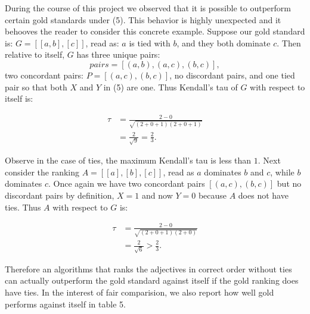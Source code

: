 During the course of this project we observed that it is possible to outperform certain gold standards under (5). This behavior is highly unexpected and it behooves the reader to consider this concrete example. Suppose our gold standard is: $G = [[a,b],[c]]$, read as: $a$ is tied with $b$, and they both dominate $c$. Then relative to itself, $G$ has three unique pairs:
\[
	pairs = [(a,b),(a,c),(b,c)],
\]
two concordant pairs: $P = [(a,c),(b,c)]$, no discordant pairs, and one tied pair so that both $X$ and $Y$ in (5) are one. Thus Kendall's tau of $G$ with respect to itself is:

\begin{align*}
	\tau &= \frac{2 - 0}{\sqrt{(2 + 0 + 1)(2 + 0 + 1)}} \\
		 &= \frac{2}{\sqrt{9}} = \frac{2}{3}.
\end{align*}

Observe in the case of ties, the maximum Kendall's tau is less than $1$. Next consider the ranking $A = [[a],[b],[c]]$, read as $a$ dominates $b$ and $c$, while $b$ dominates $c$. Once again we have two concordant pairs $[(a,c),(b,c)]$ but no discordant pairs by definition, $X = 1$ and now $Y = 0$ because $A$ does not have ties. Thus $A$ with respect to $G$ is:

\begin{align*}
	\tau &= \frac{2 - 0}{\sqrt{(2 + 0 + 1)(2 + 0)}} \\
		 &= \frac{2}{\sqrt{6}} > \frac{2}{3}.
\end{align*}

Therefore an algorithms that ranks the adjectives in correct order without ties can actually outperform the gold standard against itself if the gold ranking does have ties. In the interest of fair comparision, we also report how well gold performs against itself in table 5.

